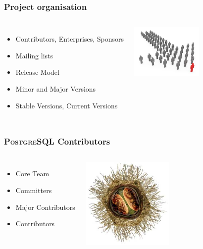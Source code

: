 \documentclass{beamer}
\begin{document}
\begin{frame}[fragile]
  \frametitle{Project organisation}

  \vfill

\begin{columns}[c]

  \begin{itemize}
  \item Contributors, Enterprises, Sponsors
  \item Mailing lists
  \item Release Model
  \item Minor and Major Versions
  \item Stable Versions, Current Versions
  \end{itemize}

\begin{center}
  \includegraphics[height=7em]{elite_contributors.jpg}
\end{center}
\end{columns}
\end{frame}

\begin{frame}[fragile]
  \frametitle{\textsc{PostgreSQL} Contributors}

  \vfill

\begin{columns}[c]

  \begin{itemize}
  \item Core Team
  \item Committers
  \item Major Contributors
  \item Contributors
  \end{itemize}

\begin{center}
  \includegraphics[height=12em]{in-core-replication.jpg}
\end{center}
\end{columns}
\end{frame}
\end{document}
